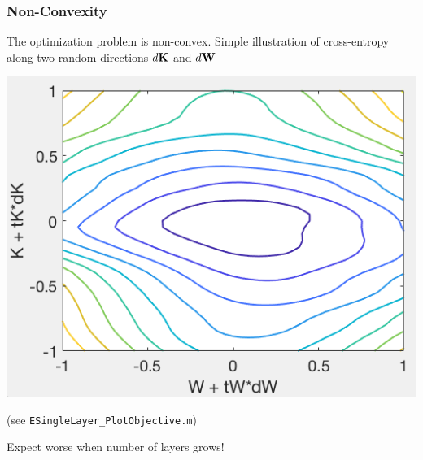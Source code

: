 \documentclass[12pt,fleqn,handout]{beamer}
\begin{document}
\begin{frame}
	\frametitle{Non-Convexity}
	The optimization problem is non-convex. Simple illustration of cross-entropy along two random directions $d{\bf K}$ and $d{\bf W}$

	\begin{center}
		\includegraphics[width=.6\textwidth]{images/nonConvexitySingleLayer}
		
		(see \texttt{ESingleLayer\_PlotObjective.m})
	\bigskip
	
	Expect worse when number of layers grows!
	\end{center}

\end{frame}
\end{document}
